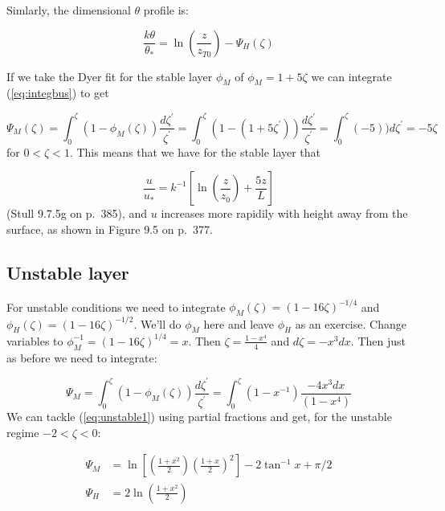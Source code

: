 \documentclass[11pt]{article}
\begin{document}
Simlarly, the dimensional $\theta$ profile is:

\begin{equation}
  \label{eq:integbus2}
  \frac{ k \theta}{\theta_*} =  \ln \left ( \frac{z }{z_{T0}} \right ) - \Psi_H(\zeta)
\end{equation}

If we take the Dyer fit for the stable layer $\phi_M$ of $\phi_M = 1 + 5 \zeta$ we
can integrate (\ref{eq:integbus}) to get 

\begin{equation}
  \label{eq:integbus3}
\Psi_M(\zeta) = \int_{0 }^{\zeta}\!(1 - \phi_M(\zeta)) \frac{ d \zeta^\prime}{\zeta^\prime}
  = \int_{0 }^{\zeta}\!(1 - (1 + 5 \zeta^\prime )) \frac{ d \zeta^\prime}{\zeta^\prime}
  = \int_{0 }^{\zeta}\!(- 5 )) d \zeta^\prime = -5 \zeta
\end{equation}
for $0 < \zeta < 1$.  This means that we have for the stable layer that

\begin{equation}
  \label{eq:stable-final}
  \frac{ u}{u_*} = k^{-1} \left [ \ln \left ( \frac{ z}{z_0} \right ) + \frac{ 5 z}{L}  \right ]
\end{equation}
(Stull 9.7.5g on p.~385), and $u$ increases more rapidily with height away from the surface, as
shown in Figure 9.5 on  p.~377.

\subsection{Unstable layer}
\label{sec:unstable-layer}

For unstable conditions we need to
integrate $\phi_M(\zeta)=(1-16\zeta)^{-1/4}$ and
$\phi_H(\zeta)=(1-16\zeta)^{-1/2}$.  We'll do $\phi_M$ here
and leave $\phi_H$ as an exercise.  Change variables
to $\phi_M^{-1}=(1 - 16\zeta)^{1/4} = x$.  Then
$\zeta=\frac{ 1-x^4}{4}$ and $d\zeta = - x^3 dx$.  Then just as before we
need to integrate:

\begin{equation}
  \label{eq:unstable1}
  \Psi_M = \int_{0 }^{\zeta}\!(1 - \phi_M(\zeta)) \frac{ d \zeta^\prime}{\zeta^\prime}
= \int_{ 0}^{\zeta}\! (1 - x^{-1}) \frac{ -4 x^3 dx}{(1 - x^4)} 
\end{equation}
We can tackle (\ref{eq:unstable1}) using partial fractions and get,
for the unstable regime $-2 < \zeta < 0$:

\begin{align}
  \Psi_M &= \ln \left [ \left ( \frac{ 1 + x^2}{2} \right ) 
\left ( \frac{ 1 + x}{2} \right )^2 \right ] - 2\tan^{-1} x + \pi/2\\
  \Psi_H & = 2 \ln \left ( \frac{ 1 + x^2}{2} \right )
\end{align}
\end{document}
